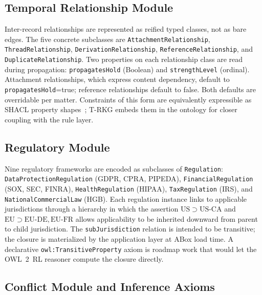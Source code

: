 \documentclass{ieeeaccess}
\begin{document}
\subsection{Temporal Relationship Module}

Inter-record relationships are represented as reified typed classes, not as bare edges. The five concrete subclasses are \texttt{AttachmentRelationship}, \texttt{ThreadRelationship}, \texttt{DerivationRelationship}, \texttt{ReferenceRelationship}, and \texttt{DuplicateRelationship}. Two properties on each relationship class are read during propagation: \texttt{propagatesHold} (Boolean) and \texttt{strengthLevel} (ordinal). Attachment relationships, which express content dependency, default to \texttt{propagatesHold}=true; reference relationships default to false. Both defaults are overridable per matter. Constraints of this form are equivalently expressible as SHACL property shapes~\cite{shacl}; T-RKG embeds them in the ontology for closer coupling with the rule layer.

\subsection{Regulatory Module}

Nine regulatory frameworks are encoded as subclasses of \texttt{Regulation}: \texttt{DataProtectionRegulation} (GDPR, CPRA, PIPEDA), \texttt{FinancialRegulation} (SOX, SEC, FINRA), \texttt{HealthRegulation} (HIPAA), \texttt{TaxRegulation} (IRS), and \texttt{NationalCommercialLaw} (HGB). Each regulation instance links to applicable jurisdictions through a hierarchy in which the assertion $\mathrm{US} \supset \mathrm{US\text{-}CA}$ and $\mathrm{EU} \supset \mathrm{EU\text{-}DE}, \mathrm{EU\text{-}FR}$ allows applicability to be inherited downward from parent to child jurisdiction. The \texttt{subJurisdiction} relation is intended to be transitive; the closure is materialized by the application layer at ABox load time. A declarative \texttt{owl:TransitiveProperty} axiom is roadmap work that would let the OWL~2~RL reasoner compute the closure directly.

\subsection{Conflict Module and Inference Axioms}
\end{document}
